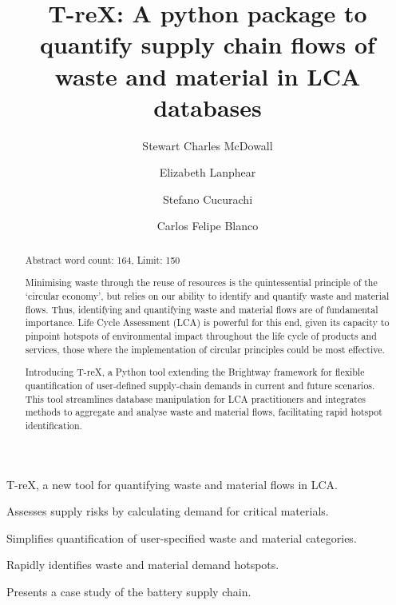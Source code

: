 \documentclass[final,5p,authoryear]{elsarticle}
\newcommand{\cbox}[1]{
    \begin{tcolorbox}[hbox, colback=red!5!white, colframe=red!65!black, boxrule=0.25pt, boxsep=2pt, left=2pt, right=2pt, top=1pt, bottom=1pt]
        \small\sffamily #1
    \end{tcolorbox}
}
\begin{document}
    \begin{highlights}
        \item T-reX, a new tool for quantifying waste and material flows in LCA.
        \item Assesses supply risks by calculating demand for critical materials.
        \item Simplifies quantification of user-specified waste and material categories.
        \item Rapidly identifies waste and material demand hotspots.
        \item Presents a case study of the battery supply chain.
    \end{highlights}


\begin{frontmatter}

    \title{T-reX: A python package to quantify supply chain flows of waste and material in LCA databases}
    \author[1]{Stewart Charles McDowall}
    \author[1]{Elizabeth Lanphear}
    \author[1]{Stefano Cucurachi}
    \author[1]{Carlos Felipe Blanco}



    \begin{abstract}
        \cbox{Abstract word count: 164, Limit: 150}
        Minimising waste through the reuse of resources is the quintessential principle of the `circular economy', but relies on our ability to identify and quantify waste and material flows.
        Thus, identifying and quantifying waste and material flows are of fundamental importance. Life Cycle Assessment (LCA) is powerful for this end, given its capacity to pinpoint hotspots of environmental impact throughout the life cycle of products and services, those where the implementation of circular principles could be most effective.

        Introducing T-reX, a Python tool extending the Brightway framework for flexible quantification of user-defined supply-chain demands in current and future scenarios. This tool streamlines database manipulation for LCA practitioners and integrates methods to aggregate and analyse waste and material flows, facilitating rapid hotspot identification.


\end{abstract}
\end{frontmatter}
\end{document}
